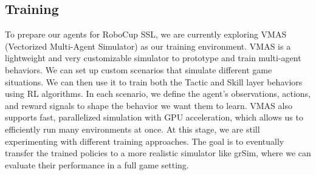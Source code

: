 \subsection{Training}
To prepare our agents for RoboCup SSL, we are currently exploring VMAS (Vectorized Multi-Agent Simulator) as our training environment. VMAS is a lightweight and very customizable simulator to prototype and train multi-agent behaviors. We can set up custom scenarios that simulate different game situations. We can then use it to train both the Tactic and Skill layer behaviors using RL algorithms. In each scenario, we define the agent's observations, actions, and reward signals to shape the behavior we want them to learn. VMAS also supports fast, parallelized simulation with GPU acceleration, which allows us to efficiently run many environments at once. At this stage, we are still experimenting with different training approaches. The goal is to eventually transfer the trained policies to a more realistic simulator like grSim, where we can evaluate their performance in a full game setting.
